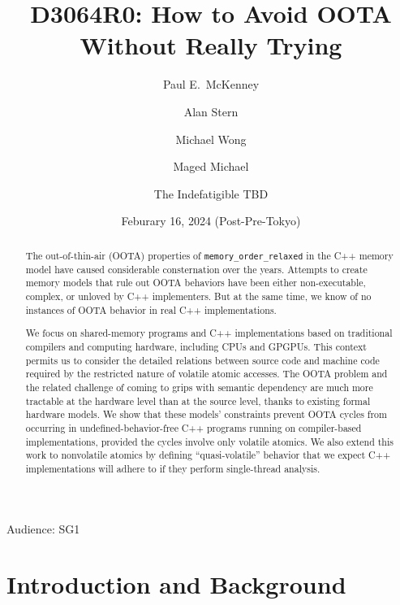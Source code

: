 \documentclass[10]{article}
\begin{document}
\title{D3064R0: How to Avoid OOTA Without Really Trying}

\newcommand{\co}[1]{\lstinline[breaklines=yes,breakatwhitespace=yes]{#1}}

\author{
Paul E.~McKenney\\{\small {}} \and
Alan Stern\\{\small {}} \and
Michael Wong\\{\small {}} \and
Maged Michael\\{\small {}} \and
The Indefatigible TBD
}
\date{Feburary 16, 2024 (Post-Pre-Tokyo)}
\maketitle{}

Audience: SG1

\begin{abstract}
	The out-of-thin-air (OOTA) properties
	of \co{memory_order_relaxed} in the C++ memory model
	have caused considerable consternation over the years.
	Attempts to create memory models that rule out OOTA behaviors
	have been either non-executable, complex, or unloved by C++
	implementers.
	But at the same time, we know of no instances of OOTA behavior
	in real C++ implementations.

	We focus on shared-memory programs and
	C++ implementations based on traditional compilers and
	computing hardware, including CPUs and GPGPUs.
	This context permits us to consider the detailed relations
	between source code and machine code required by the restricted
	nature of volatile atomic accesses.
	The OOTA problem and the related challenge of coming to grips
	with semantic dependency are much more tractable at the hardware
	level than at the source level, thanks to existing formal
	hardware models.
	We show that these models' constraints prevent OOTA cycles
	from occurring in undefined-behavior-free C++ programs running
	on compiler-based implementations, provided the cycles involve
	only volatile atomics.
	We also extend this work to nonvolatile atomics by defining
	``quasi-volatile'' behavior that we expect C++ implementations
	will adhere to if they perform single-thread analysis.
\end{abstract}

\pagebreak

\tableofcontents

\pagebreak

\section{Introduction and Background}
\label{sec:Introduction}
\end{document}
